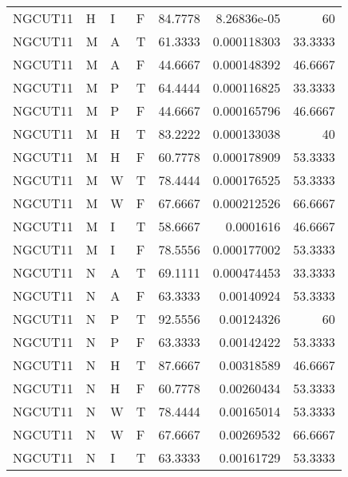 \begin{longtable}{llllrrr}
    NGCUT11  & H         & I         & F          & 84.7778    & 8.26836e-05 & 60       \\
    NGCUT11  & M         & A         & T          & 61.3333    & 0.000118303 & 33.3333  \\
    NGCUT11  & M         & A         & F          & 44.6667    & 0.000148392 & 46.6667  \\
    NGCUT11  & M         & P         & T          & 64.4444    & 0.000116825 & 33.3333  \\
    NGCUT11  & M         & P         & F          & 44.6667    & 0.000165796 & 46.6667  \\
    NGCUT11  & M         & H         & T          & 83.2222    & 0.000133038 & 40       \\
    NGCUT11  & M         & H         & F          & 60.7778    & 0.000178909 & 53.3333  \\
    NGCUT11  & M         & W         & T          & 78.4444    & 0.000176525 & 53.3333  \\
    NGCUT11  & M         & W         & F          & 67.6667    & 0.000212526 & 66.6667  \\
    NGCUT11  & M         & I         & T          & 58.6667    & 0.0001616   & 46.6667  \\
    NGCUT11  & M         & I         & F          & 78.5556    & 0.000177002 & 53.3333  \\
    NGCUT11  & N         & A         & T          & 69.1111    & 0.000474453 & 33.3333  \\
    NGCUT11  & N         & A         & F          & 63.3333    & 0.00140924  & 53.3333  \\
    NGCUT11  & N         & P         & T          & 92.5556    & 0.00124326  & 60       \\
    NGCUT11  & N         & P         & F          & 63.3333    & 0.00142422  & 53.3333  \\
    NGCUT11  & N         & H         & T          & 87.6667    & 0.00318589  & 46.6667  \\
    NGCUT11  & N         & H         & F          & 60.7778    & 0.00260434  & 53.3333  \\
    NGCUT11  & N         & W         & T          & 78.4444    & 0.00165014  & 53.3333  \\
    NGCUT11  & N         & W         & F          & 67.6667    & 0.00269532  & 66.6667  \\
    NGCUT11  & N         & I         & T          & 63.3333    & 0.00161729  & 53.3333  \\

\end{longtable}
